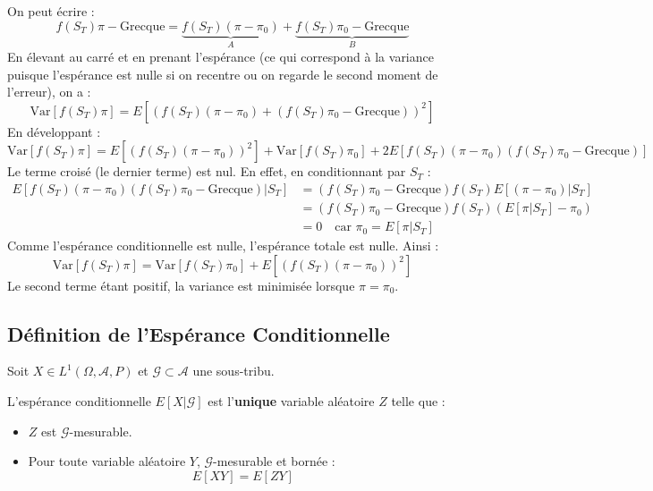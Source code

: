 \documentclass{article}
\begin{document}
On peut écrire :
\[
f(S_T)\pi - \text{Grecque} = \underbrace{f(S_T)(\pi - \pi_0)}_{A} + \underbrace{f(S_T)\pi_0 - \text{Grecque}}_{B}
\]
En élevant au carré et en prenant l'espérance (ce qui correspond à la variance puisque l'espérance est nulle si on recentre ou on regarde le second moment de l'erreur), on a :
\[
\text{Var}[f(S_T)\pi] = E \left[ (f(S_T)(\pi - \pi_0) + (f(S_T)\pi_0 - \text{Grecque}))^2 \right]
\]
En développant :
\[
\text{Var}[f(S_T)\pi] = E[(f(S_T)(\pi - \pi_0))^2] + \text{Var}[f(S_T)\pi_0] + 2 E \left[ f(S_T)(\pi - \pi_0) (f(S_T)\pi_0 - \text{Grecque}) \right]
\]
Le terme croisé (le dernier terme) est nul. En effet, en conditionnant par $S_T$ :
\begin{align*}
E [ f(S_T)(\pi - \pi_0) (f(S_T)\pi_0 - \text{Grecque}) | S_T ] &= (f(S_T)\pi_0 - \text{Grecque}) f(S_T) E [ (\pi - \pi_0) | S_T ] \\
&= (f(S_T)\pi_0 - \text{Grecque}) f(S_T) ( E[\pi|S_T] - \pi_0 ) \\
&= 0 \quad \text{car } \pi_0 = E[\pi|S_T]
\end{align*}
Comme l'espérance conditionnelle est nulle, l'espérance totale est nulle.
Ainsi :
\[
\text{Var}[f(S_T)\pi] = \text{Var}[f(S_T)\pi_0] + E[(f(S_T)(\pi - \pi_0))^2]
\]
Le second terme étant positif, la variance est minimisée lorsque $\pi = \pi_0$.

\subsection{Définition de l'Espérance Conditionnelle}
Soit $X \in L^1(\Omega, \mathcal{A}, P)$ et $\mathcal{G} \subset \mathcal{A}$ une sous-tribu.

L'espérance conditionnelle $E[X|\mathcal{G}]$ est l'\textbf{unique} variable aléatoire $Z$ telle que :
\begin{itemize}
    \item $Z$ est $\mathcal{G}$-mesurable.
    \item Pour toute variable aléatoire $Y$, $\mathcal{G}$-mesurable et bornée :
    \[
    E[XY] = E[ZY]
    \]
\end{itemize}
\end{document}
